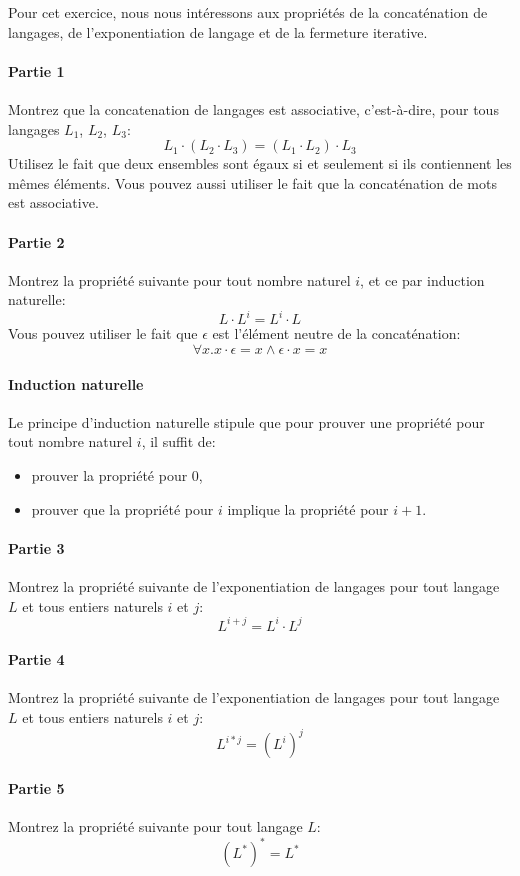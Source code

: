 \documentclass[12pt,french,a4paper]{article}
\begin{document}
\begin{question}
Pour cet exercice, nous nous intéressons aux propriétés de la concaténation de langages, de l'exponentiation de langage et de la fermeture iterative.

\paragraph{Partie 1} Montrez que la concatenation de langages est associative, c'est-à-dire, pour tous langages $L_1$, $L_2$, $L_3$:
\[
L_1 \cdot (L_2 \cdot L_3) = (L_1 \cdot L_2) \cdot L_3
\]
Utilisez le fait que deux ensembles sont égaux si et seulement si ils contiennent les mêmes éléments. Vous pouvez aussi utiliser le fait que la concaténation de mots est associative.

\paragraph{Partie 2} Montrez la propriété suivante pour tout nombre naturel $i$, et ce par induction naturelle:
\[
L \cdot L^i = L^i \cdot L 
\]
Vous pouvez utiliser le fait que $\epsilon$ est l'élément neutre de la concaténation:
\[
\forall x. x \cdot \epsilon = x \wedge \epsilon \cdot x = x
\]

\paragraph{Induction naturelle} Le principe d'induction naturelle stipule que pour prouver une propriété pour tout nombre naturel $i$, il suffit de:
\begin{itemize}
\item prouver la propriété pour $0$,
\item prouver que la propriété pour $i$ implique la propriété pour $i + 1$.
\end{itemize}

\paragraph{Partie 3} Montrez la propriété suivante de l'exponentiation de langages pour tout langage $L$ et tous entiers naturels $i$ et $j$:
\[
L^{i + j} = L^i \cdot L^j
\]

\paragraph{Partie 4} Montrez la propriété suivante de l'exponentiation de langages pour tout langage $L$ et tous entiers naturels $i$ et $j$:
\[
L^{i * j} = (L^i)^j
\]

\paragraph{Partie 5} Montrez la propriété suivante pour tout langage $L$:
\[
(L^*)^* = L^*
\]
\end{question}
\end{document}
